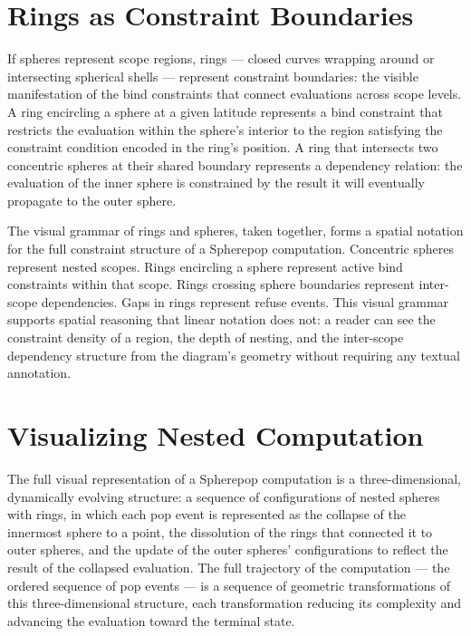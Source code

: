 \documentclass[12pt,openany]{book}
\theoremstyle{plain}
\theoremstyle{definition}
\theoremstyle{remark}
\begin{document}
\section{Rings as Constraint Boundaries}

If spheres represent scope regions, rings — closed curves wrapping around or intersecting spherical shells — represent constraint boundaries: the visible manifestation of the bind constraints that connect evaluations across scope levels. A ring encircling a sphere at a given latitude represents a bind constraint that restricts the evaluation within the sphere's interior to the region satisfying the constraint condition encoded in the ring's position. A ring that intersects two concentric spheres at their shared boundary represents a dependency relation: the evaluation of the inner sphere is constrained by the result it will eventually propagate to the outer sphere.

The visual grammar of rings and spheres, taken together, forms a spatial notation for the full constraint structure of a Spherepop computation. Concentric spheres represent nested scopes. Rings encircling a sphere represent active bind constraints within that scope. Rings crossing sphere boundaries represent inter-scope dependencies. Gaps in rings represent refuse events. This visual grammar supports spatial reasoning that linear notation does not: a reader can see the constraint density of a region, the depth of nesting, and the inter-scope dependency structure from the diagram's geometry without requiring any textual annotation.

\section{Visualizing Nested Computation}

The full visual representation of a Spherepop computation is a three-dimensional, dynamically evolving structure: a sequence of configurations of nested spheres with rings, in which each pop event is represented as the collapse of the innermost sphere to a point, the dissolution of the rings that connected it to outer spheres, and the update of the outer spheres' configurations to reflect the result of the collapsed evaluation. The full trajectory of the computation — the ordered sequence of pop events — is a sequence of geometric transformations of this three-dimensional structure, each transformation reducing its complexity and advancing the evaluation toward the terminal state.
\end{document}
